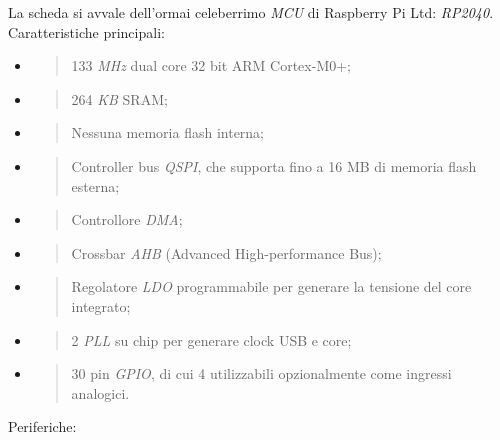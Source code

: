 La scheda si avvale dell'ormai celeberrimo \emph{MCU} di Raspberry Pi Ltd: \emph{RP2040}.\\
Caratteristiche principali:

\begin{itemize}
\item
  \begin{quote}
  133 \emph{MHz} dual core 32 bit ARM Cortex-M0+;
  \end{quote}
\item
  \begin{quote}
  264 \emph{KB} SRAM;
  \end{quote}
\item
  \begin{quote}
  Nessuna memoria flash interna;
  \end{quote}
\item
  \begin{quote}
  Controller bus \emph{QSPI}, che supporta fino a 16 MB di memoria flash
  esterna;
  \end{quote}
\item
  \begin{quote}
  Controllore \emph{DMA};
  \end{quote}
\item
  \begin{quote}
  Crossbar \emph{AHB} (Advanced High-performance Bus);
  \end{quote}
\item
  \begin{quote}
  Regolatore \emph{LDO} programmabile per generare la tensione del core
  integrato;
  \end{quote}
\item
  \begin{quote}
  2 \emph{PLL} su chip per generare clock USB e core;
  \end{quote}
\item
  \begin{quote}
  30 pin \emph{GPIO}, di cui 4 utilizzabili opzionalmente come ingressi
  analogici.
  \end{quote}
\end{itemize}

\noindent Periferiche:

